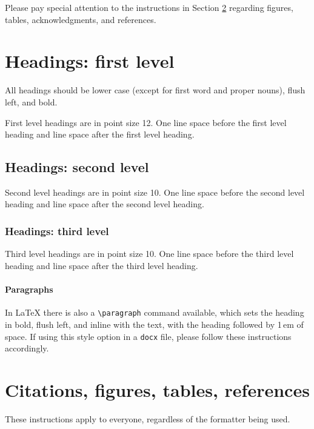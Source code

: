 \documentclass{article}
\begin{document}
Please pay special attention to the instructions in Section \ref{others}
regarding figures, tables, acknowledgments, and references.

\section{Headings: first level}
\label{headings}

All headings should be lower case (except for first word and proper nouns),
flush left, and bold.

First level headings are in point size 12. One line space before the first level heading and  line space after the first level heading.

\subsection{Headings: second level}

Second level headings are in point size 10. One line space before the second level heading and  line space after the second level heading.

\subsubsection{Headings: third level}

Third level headings are in point size 10. One line space before the third level heading and  line space after the third level heading. 

\paragraph{Paragraphs}

In \LaTeX{} there is also a \verb+\paragraph+ command available, which sets the heading in bold, flush left, and inline with the text, with the heading followed by 1\,em of space. If using this style option in a \verb+docx+ file, please follow these instructions accordingly.

\section{Citations, figures, tables, references}
\label{others}

These instructions apply to everyone, regardless of the formatter being used.
\end{document}

